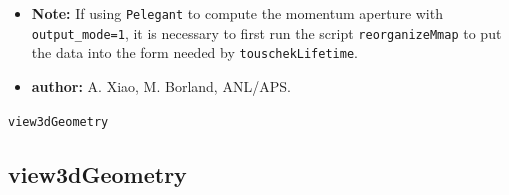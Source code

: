 \documentclass[11pt]{article}
\begin{document}
\begin{itemize}
\begin{itemize}
 the number of superperiods is set.
\item {\tt -length={\em mm}} --- Specify the rms bunch length.  This is an alternative to giving rf parameters.
\item {\tt -verbosity} --- If nonzero, program execution information is printed to the standard output.
\item {\tt -ignoreMismatch} --- If given, then mismatch of element names between the twiss and momentum
  aperture files is ignored.  May be useful if there are zero-length elements.
\item {\tt -deltaLimit} --- Give the maximum value for the momentum aperture, in percent.  If not specified,
  the values in the momentum aperture input file are used, possibly altered by the use of the
  {\tt -RF} option with the {\tt limit} qualifier.  If both {\tt -deltaLimit} and {\tt -RF=limit...} are
  given, the smaller is enforced.
\item {\tt -method} --- The integral of Piwinski's formula can be done
  in two ways. ``0'' - direct integral of parameter {\em $\tau$}, this
  method is also used in {\tt elegant}. 1 - substitute variable {\em
    $\tau$} with variable {\em k}, with $\tau=\tan^2(k)$. These two
  methods give you same results.
\item {\tt polarization} --- If given, the Touschek lifetime is adjusted to reflect polarization, based on
  \cite{PhysRevAccelBeams.27.124401}.
\end{itemize}

\item {\bf Note:} If using \verb|Pelegant| to compute the momentum aperture with \verb|output_mode=1|, it is necessary to first run the script
  \verb|reorganizeMmap| to put the data into the form needed by \verb|touschekLifetime|.

\item {\bf author:} A. Xiao, M. Borland, ANL/APS.

\end{itemize}


\newpage
\begin{center}{\Large\verb|view3dGeometry|}\end{center}
\subsection{view3dGeometry}
\end{document}
